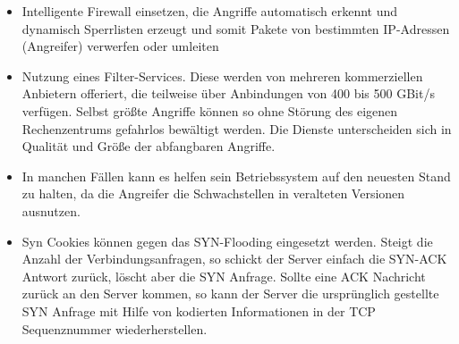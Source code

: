 \begin{itemize}
	\item Intelligente Firewall einsetzen, die Angriffe automatisch erkennt und dynamisch Sperrlisten erzeugt und somit Pakete von bestimmten IP-Adressen (Angreifer) verwerfen oder umleiten
	\item Nutzung eines Filter-Services. Diese werden von mehreren kommerziellen Anbietern offeriert, die teilweise über Anbindungen von 400 bis 500 GBit/s verfügen. Selbst größte Angriffe können so ohne Störung des eigenen Rechenzentrums gefahrlos bewältigt werden. Die Dienste unterscheiden sich in Qualität und Größe der abfangbaren Angriffe. 
	\item In manchen Fällen kann es helfen sein Betriebssystem auf den neuesten Stand zu halten, da die Angreifer die Schwachstellen in veralteten Versionen ausnutzen.
	\item Syn Cookies können gegen das SYN-Flooding eingesetzt werden. Steigt die Anzahl der Verbindungsanfragen, so schickt der Server einfach die SYN-ACK Antwort zurück, löscht aber die SYN Anfrage. Sollte eine ACK Nachricht zurück an den Server kommen, so kann der Server die ursprünglich gestellte SYN Anfrage mit Hilfe von kodierten Informationen in der TCP Sequenznummer wiederherstellen.  
\end{itemize}
